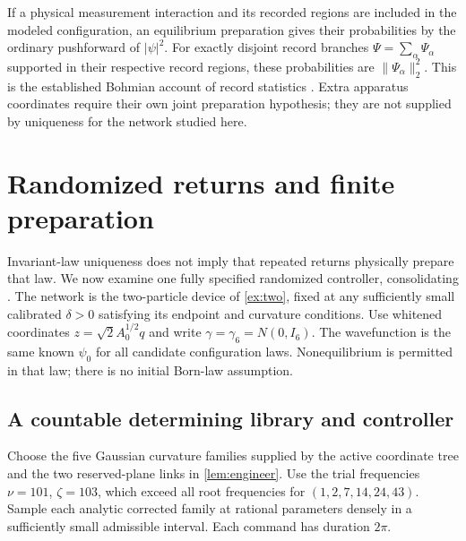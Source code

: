 \documentclass[11pt]{article}
\numberwithin{equation}{section}
\theoremstyle{definition}
\begin{document}
If a physical measurement interaction and its recorded regions
are included in the modeled configuration, an equilibrium
preparation gives their probabilities by the ordinary pushforward
of $|\psi|^2$. For exactly disjoint record branches
$\Psi=\sum_\alpha\Psi_\alpha$ supported in their respective
record regions, these probabilities are $\|\Psi_\alpha\|_2^2$.
This is the established Bohmian account of record statistics
\citep{DGZ2004}. Extra apparatus coordinates require their own
joint preparation hypothesis; they are not supplied by uniqueness
for the network studied here.

\section{Randomized returns and finite preparation}\label{sec:random}

Invariant-law uniqueness does not imply that repeated returns physically prepare that law. We now examine one fully specified randomized controller, consolidating \citet{RandomizedReport}. The network is the two-particle device of \cref{ex:two}, fixed at any sufficiently small calibrated $\delta>0$ satisfying its endpoint and curvature conditions. Use whitened coordinates $z=\sqrt2 A_0^{1/2}q$ and write $\gamma=\gamma_6=N(0,I_6)$. The wavefunction is the same known $\psi_0$ for all candidate configuration laws. Nonequilibrium is permitted in that law; there is no initial Born-law assumption.

\subsection{A countable determining library and controller}
Choose the five Gaussian curvature families supplied by the active coordinate tree and the two reserved-plane links in \cref{lem:engineer}. Use the trial frequencies $\nu=101$, $\zeta=103$, which exceed all root frequencies for $(1,2,7,14,24,43)$. Sample each analytic corrected family at rational parameters densely in a sufficiently small admissible interval. Each command has duration $2\pi$.
\end{document}
